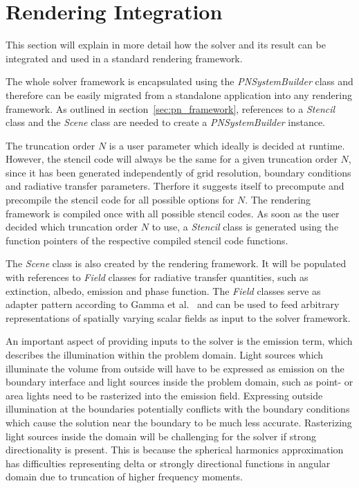 \section{Rendering Integration}
\label{sec:pn_rendering_integration}

This section will explain in more detail how the solver and its result can be integrated and used in a standard rendering framework.

The whole solver framework is encapsulated using the \emph{PNSystemBuilder} class and therefore can be easily migrated from a standalone application into any rendering framework. As outlined in section~\ref{sec:pn_framework}, references to a \emph{Stencil} class and the \emph{Scene} class are needed to create a \emph{PNSystemBuilder} instance.

The truncation order $N$ is a user parameter which ideally is decided at runtime. However, the stencil code will always be the same for a given truncation order $N$, since it has been generated independently of grid resolution, boundary conditions and radiative transfer parameters. Therfore it suggests itself to precompute and precompile the stencil code for all possible options for $N$. The rendering framework is compiled once with all possible stencil codes. As soon as the user decided which truncation order $N$ to use, a \emph{Stencil} class is generated using the function pointers of the respective compiled stencil code functions.

The \emph{Scene} class is also created by the rendering framework. It will be populated with references to \emph{Field} classes for radiative transfer quantities, such as extinction, albedo, emission and phase function. The \emph{Field} classes serve as adapter pattern according to Gamma et al.~\cite{Gamma95} and can be used to feed arbitrary representations of spatially varying scalar fields as input to the solver framework.

An important aspect of providing inputs to the solver is the emission term, which describes the illumination within the problem domain. Light sources which illuminate the volume from outside will have to be expressed as emission on the boundary interface and light sources inside the problem domain, such as point- or area lights need to be rasterized into the emission field. Expressing outside illumination at the boundaries potentially conflicts with the boundary conditions which cause the solution near the boundary to be much less accurate. Rasterizing light sources inside the domain will be challenging for the solver if strong directionality is present. This is because the spherical harmonics approximation has difficulties representing delta or strongly directional functions in angular domain due to truncation of higher frequency moments.

